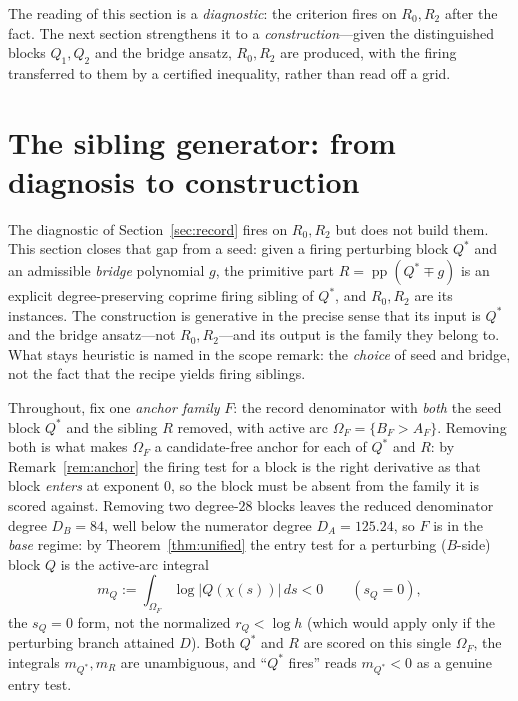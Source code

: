 \documentclass[11pt,reqno]{amsart}
\theoremstyle{plain}
\theoremstyle{definition}
\newcommand{\rQ}{r_Q}
\newcommand{\dA}{D_A}
\newcommand{\dB}{D_B}
\DeclareMathOperator{\pp}{pp}
\begin{document}
The reading of this section is a \emph{diagnostic}: the criterion fires on $R_0,R_2$
after the fact. The next section strengthens it to a \emph{construction}---given the
distinguished blocks $Q_1,Q_2$ and the bridge ansatz, $R_0,R_2$ are produced, with the
firing transferred to them by a certified inequality, rather than read off a grid.

\section{The sibling generator: from diagnosis to construction}\label{sec:generator}

The diagnostic of Section~\ref{sec:record} fires on $R_0,R_2$ but does not build them.
This section closes that gap from a seed: given a firing perturbing block $Q^*$ and an
admissible \emph{bridge} polynomial $g$, the primitive part $R=\pp(Q^*\mp g)$ is an
explicit degree-preserving coprime firing sibling of $Q^*$, and $R_0,R_2$ are its
instances. The construction is generative in the precise sense that its input is
$Q^*$ and the bridge ansatz---not $R_0,R_2$---and its output is the family they belong
to. What stays heuristic is named in the scope remark: the \emph{choice} of seed and
bridge, not the fact that the recipe yields firing siblings.

Throughout, fix one \emph{anchor family} $F$: the record denominator with \emph{both}
the seed block $Q^*$ and the sibling $R$ removed, with active arc
$\Omega_F=\{B_F>A_F\}$. Removing both is what makes $\Omega_F$ a candidate-free anchor
for each of $Q^*$ and $R$: by Remark~\ref{rem:anchor} the firing test for a block is the
right derivative as that block \emph{enters} at exponent $0$, so the block must be absent
from the family it is scored against. Removing two degree-$28$ blocks leaves the reduced
denominator degree $\dB=84$, well below the numerator degree $\dA=125.24$, so $F$ is in
the \emph{base} regime: by Theorem~\ref{thm:unified} the entry test for a perturbing
($B$-side) block $Q$ is the active-arc integral
\begin{equation}\label{eq:mdef}
  m_Q:=\int_{\Omega_F}\log|Q(\chi(s))|\,ds<0\qquad(s_Q=0),
\end{equation}
the $s_Q=0$ form, not the normalized $\rQ<\log h$ (which would apply only if the
perturbing branch attained $D$). Both $Q^*$ and $R$ are scored on this single
$\Omega_F$, the integrals $m_{Q^*},m_R$ are unambiguous, and ``$Q^*$ fires'' reads
$m_{Q^*}<0$ as a genuine entry test.
\end{document}
